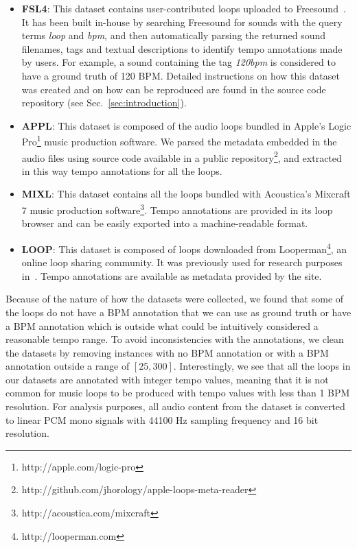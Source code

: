 \documentclass{article}
\begin{document}
\begin{itemize}
	\item \textbf{FSL4}: This dataset contains user-contributed loops uploaded to Freesound~\cite{Font2013}. It has been built in-house by searching Freesound for sounds with the query terms \emph{loop} and \emph{bpm}, and then automatically parsing the returned sound filenames, tags and textual descriptions to identify tempo annotations made by users. For example, a sound containing the tag \emph{120bpm} is considered to have a ground truth of 120 BPM. Detailed instructions on how this dataset was created and on how can be reproduced are found in the source code repository (see Sec.~\ref{sec:introduction}). 
	\item \textbf{APPL}: This dataset is composed of the audio loops bundled in Apple's Logic Pro\footnote{http://apple.com/logic-pro} music production software. 
	We parsed the metadata embedded in the audio files using source code available in a public repository\footnote{http://github.com/jhorology/apple-loops-meta-reader}, and extracted in this way tempo annotations for all the loops. %
	\item \textbf{MIXL}: This dataset contains all the loops bundled with Acoustica's Mixcraft 7 music production software\footnote{http://acoustica.com/mixcraft}. Tempo annotations are provided in its loop browser and can be easily exported into a machine-readable format.
	\item \textbf{LOOP}: This dataset is composed of loops downloaded from Looperman\footnote{http://looperman.com}, an online loop sharing community. It was previously used for research purposes in~\cite{Roma2015}. Tempo annotations are available as metadata provided by the site.
\end{itemize}

Because of the nature of how the datasets were collected, we found that some of the loops do not have a BPM annotation that we can use as ground truth or have a BPM annotation which is outside what could be intuitively considered a reasonable tempo range. To avoid inconsistencies with the annotations, we clean the datasets by removing instances with no BPM annotation or with a BPM annotation outside a range of $[25, 300]$. 
Interestingly, we see that all the loops in our datasets are annotated with integer tempo values, meaning that it is not common for music loops to be produced with tempo values with less than 1 BPM resolution.
For analysis purposes, all audio content from the dataset is converted to linear PCM mono signals with 44100 Hz sampling frequency and 16 bit resolution.
\end{document}
